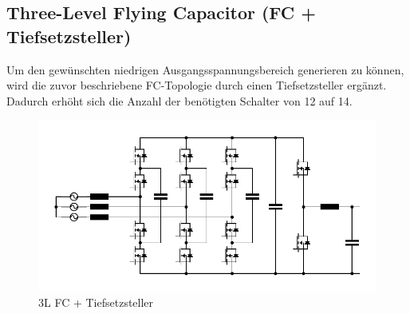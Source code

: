 	
	\subsection{Three-Level Flying Capacitor (FC + Tiefsetzsteller)}
		Um den gewünschten niedrigen Ausgangsspannungsbereich generieren zu können, wird die zuvor beschriebene FC-Topologie durch einen Tiefsetzsteller ergänzt. Dadurch erhöht sich die Anzahl der benötigten Schalter von 12 auf 14.
		\begin{figure}
			\centering
			\includegraphics[width=1\linewidth]{content/Grafiken/3L-FC-Boost+Buck}
			\caption{3L FC + Tiefsetzsteller}
			\label{fig:3l-fc-boostbuck}
		\end{figure}

